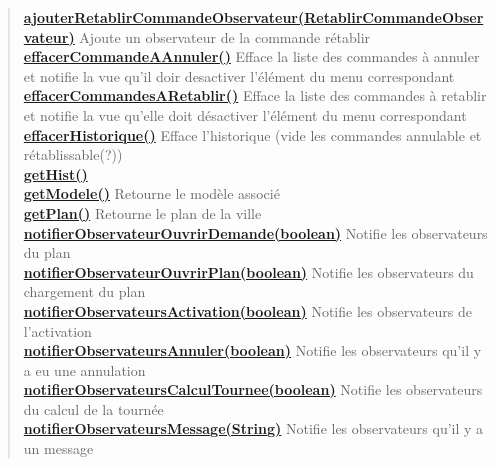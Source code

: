 \documentclass[11pt,a4paper]{report}
\begin{document}
{{{{{{\begin{verse}
\hyperlink{controleur.ControleurDonnees.ajouterRetablirCommandeObservateur(controleur.observateur.RetablirCommandeObservateur)}{{\bf ajouterRetablirCommandeObservateur(RetablirCommandeObservateur)}} Ajoute un observateur de la commande rétablir\\
\hyperlink{controleur.ControleurDonnees.effacerCommandeAAnnuler()}{{\bf effacerCommandeAAnnuler()}} Efface la liste des commandes à annuler et notifie la vue qu'il doir desactiver l'élément du menu correspondant\\
\hyperlink{controleur.ControleurDonnees.effacerCommandesARetablir()}{{\bf effacerCommandesARetablir()}} Efface la liste des commandes à retablir et notifie la vue qu'elle doit désactiver l'élément du menu correspondant\\
\hyperlink{controleur.ControleurDonnees.effacerHistorique()}{{\bf effacerHistorique()}} Efface l'historique (vide les commandes annulable et rétablissable(?))\\
\hyperlink{controleur.ControleurDonnees.getHist()}{{\bf getHist()}} \\
\hyperlink{controleur.ControleurDonnees.getModele()}{{\bf getModele()}} Retourne le modèle associé\\
\hyperlink{controleur.ControleurDonnees.getPlan()}{{\bf getPlan()}} Retourne le plan de la ville\\
\hyperlink{controleur.ControleurDonnees.notifierObservateurOuvrirDemande(boolean)}{{\bf notifierObservateurOuvrirDemande(boolean)}} Notifie les observateurs du plan\\
\hyperlink{controleur.ControleurDonnees.notifierObservateurOuvrirPlan(boolean)}{{\bf notifierObservateurOuvrirPlan(boolean)}} Notifie les observateurs du chargement du plan\\
\hyperlink{controleur.ControleurDonnees.notifierObservateursActivation(boolean)}{{\bf notifierObservateursActivation(boolean)}} Notifie les observateurs de l'activation\\
\hyperlink{controleur.ControleurDonnees.notifierObservateursAnnuler(boolean)}{{\bf notifierObservateursAnnuler(boolean)}} Notifie les observateurs qu'il y a eu une annulation\\
\hyperlink{controleur.ControleurDonnees.notifierObservateursCalculTournee(boolean)}{{\bf notifierObservateursCalculTournee(boolean)}} Notifie les observateurs du calcul de la tournée\\
\hyperlink{controleur.ControleurDonnees.notifierObservateursMessage(java.lang.String)}{{\bf notifierObservateursMessage(String)}} Notifie les observateurs qu'il y a un message\\

\end{verse}}}}}}}
\end{document}
